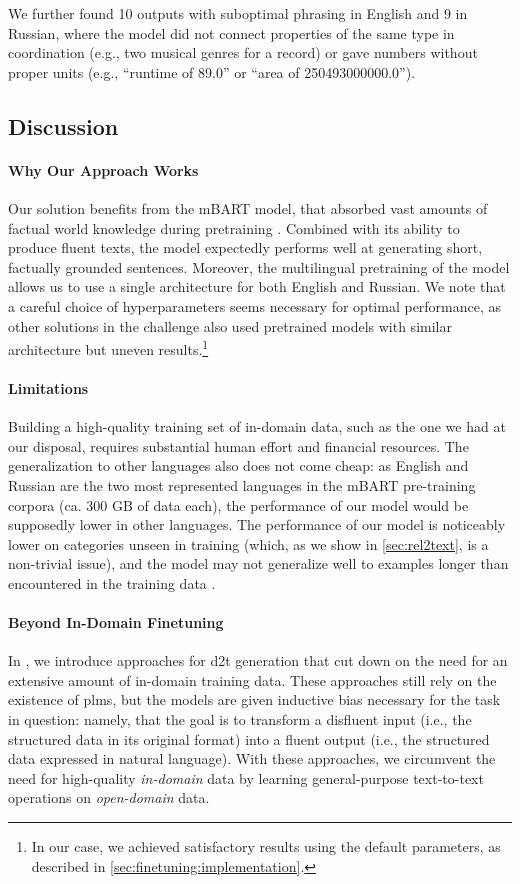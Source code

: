 We further found 10 outputs with suboptimal phrasing in English and 9 in Russian, where the model did not connect properties of the same type in coordination (e.g., two musical genres for a record) or gave numbers without proper units (e.g., ``runtime of 89.0'' or ``area of 250493000000.0'').

\subsection{Discussion}
\label{sec:finetuning:discussion}
\paragraph{Why Our Approach Works} Our solution benefits from the mBART model, that absorbed vast amounts of factual world knowledge during pretraining \cite{petroni2019language}. Combined with its ability to produce fluent texts, the model expectedly performs well at generating short, factually grounded sentences. Moreover, the multilingual pretraining of the model allows us to use a single architecture for both English and Russian. We note that a careful choice of hyperparameters seems necessary for optimal performance, as other solutions in the challenge also used pretrained models with similar architecture but uneven results.\footnote{In our case, we achieved satisfactory results using the default parameters, as described in \autoref{sec:finetuning:implementation}.}

\paragraph{Limitations} Building a high-quality training set of in-domain data, such as the one we had at our disposal, requires substantial human effort and financial resources. The generalization to other languages also does not come cheap: as English and Russian are the two most represented languages in the mBART pre-training corpora (ca. 300 GB of data each), the performance of our model would be supposedly lower in other languages. The performance of our model is noticeably lower on categories unseen in training (which, as we show in \autoref{sec:rel2text}, is a non-trivial issue), and the model may not generalize well to examples longer than encountered in the training data \cite{zhouWhatAlgorithmsCan2023,xuCompositionalGeneralizationDatatoText2023}.


\paragraph{Beyond In-Domain Finetuning} In , we introduce approaches for \ac{d2t} generation that cut down on the need for an extensive amount of in-domain training data. These approaches still rely on the existence of \acp{plm}, but the models are given inductive bias necessary for the task in question: namely, that the goal is to transform a disfluent input (i.e., the structured data in its original format) into a fluent output (i.e., the structured data expressed in natural language). With these approaches, we circumvent the need for high-quality \emph{in-domain} data by learning general-purpose text-to-text operations on \emph{open-domain} data.


